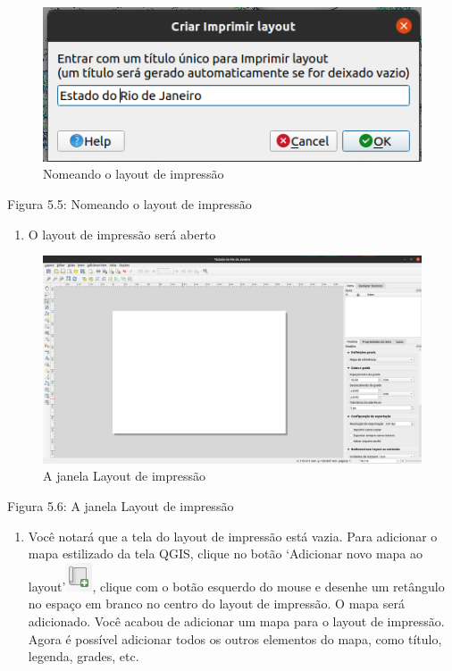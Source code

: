 \documentclass[
  portuguese,
]{krantz}
\providecommand{\tightlist}{%
  \setlength{\itemsep}{0pt}\setlength{\parskip}{0pt}}
\begin{document}
\begin{figure}
\centering
\includegraphics{media/modulo5/new-print-layout-name.png}
\caption{Nomeando o layout de impressão}
\end{figure}

Figura 5.5: Nomeando o layout de impressão

\begin{enumerate}
\def\labelenumi{\arabic{enumi}.}
\setcounter{enumi}{2}
\tightlist
\item
  O layout de impressão será aberto
\end{enumerate}

\begin{figure}
\centering
\includegraphics{media/modulo5/new-print-layout-window.png}
\caption{A janela Layout de impressão}
\end{figure}

Figura 5.6: A janela Layout de impressão

\begin{enumerate}
\def\labelenumi{\arabic{enumi}.}
\setcounter{enumi}{3}
\tightlist
\item
  Você notará que a tela do layout de impressão está vazia. Para adicionar o mapa estilizado da tela QGIS, clique no botão `Adicionar novo mapa ao layout'\includegraphics{media/modulo5/add_new_map_to_layout.png}, clique com o botão esquerdo do mouse e desenhe um retângulo no espaço em branco no centro do layout de impressão. O mapa será adicionado. Você acabou de adicionar um mapa para o layout de impressão. Agora é possível adicionar todos os outros elementos do mapa, como título, legenda, grades, etc.
\end{enumerate}
\end{document}

